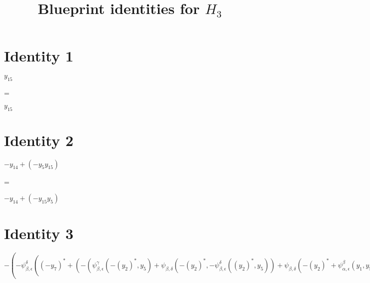 \documentclass[a4paper,landscape]{article}
\title{Blueprint identities for $ H_3 $}
\begin{document}
\maketitle
\section*{Identity 1}

$ y_{15} $

\addvspace{0.5cm}
=

\addvspace{0.5cm}
$ y_{15} $

\section*{Identity 2}

$ -y_{14}+(-y_5y_{15}) $

\addvspace{0.5cm}
=

\addvspace{0.5cm}
$ -y_{14}+(-y_{15}y_5) $

\section*{Identity 3}

$ -(-\psi_{\beta,\epsilon}^\delta((-y_7)^*+(-(\psi_{\beta,\epsilon}^\gamma(-(y_2)^*,y_5)+\psi_{\beta,\delta}(-(y_2)^*,-\psi_{\beta,\epsilon}^\delta((y_2)^*,y_5))+\psi_{\beta,\delta}(-(y_2)^*+\psi_{\alpha,\epsilon}^\beta(y_1,y_5),\psi_{\alpha,\epsilon}^\delta(y_1,y_5)+\psi_{\gamma,\epsilon}(-y_3,y_5)+(-(y_4)^*))+\psi_{\alpha,\delta}^\gamma(y_1,\psi_{\alpha,\epsilon}^\delta(y_1,y_5)+\psi_{\gamma,\epsilon}(-y_3,y_5)+(-(y_4)^*))+\psi_{\alpha,\epsilon}^\gamma(y_1,y_5)+(-y_3))y_{14})^*,y_{15})+\psi_{\alpha,\epsilon}^\delta(-(-\psi_{\beta,\epsilon}^\delta((y_2)^*,y_5)+\psi_{\alpha,\epsilon}^\delta(y_1,y_5)+\psi_{\gamma,\epsilon}(-y_3,y_5)+(-(y_4)^*)),y_{15})+\psi_{\gamma,\epsilon}(-\psi_{\beta,\epsilon}^\delta((-y_6)^*+(-y_1y_7)^*,y_{14})+\psi_{\alpha,\epsilon}^\delta(-(-(y_2)^*+\psi_{\alpha,\epsilon}^\beta(y_1,y_5)+\psi_{\alpha,\gamma}(y_1,\psi_{\alpha,\delta}^\gamma(y_1,\psi_{\alpha,\epsilon}^\delta(y_1,y_5)+\psi_{\gamma,\epsilon}(-y_3,y_5)+(-(y_4)^*))+\psi_{\alpha,\epsilon}^\gamma(y_1,y_5)+(-y_3))+\psi_{\alpha,\delta}^\beta(y_1,\psi_{\alpha,\epsilon}^\delta(y_1,y_5)+\psi_{\gamma,\epsilon}(-y_3,y_5)+(-(y_4)^*))),y_{14})+\psi_{\gamma,\epsilon}(-y_8,y_{14})+(-(y_{11})^*),y_{15})+(-(-((\psi_{\alpha,\delta}^\beta(y_{14},y_{10}))^*+(-\psi_{\alpha,\epsilon}^\beta(y_{14},y_1))^*+(-\psi_{\alpha,\gamma}(y_{14},y_{12}))^*+(-y_{13})^*))^*)) $
\end{document}
